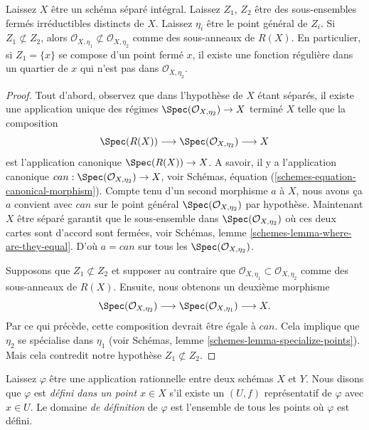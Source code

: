 \begin{lemma}

\label{lemma-distinct-local-rings}
Laissez $X$ être un schéma séparé intégral. Laissez $Z_1$, $Z_2$ être des sous-ensembles fermés irréductibles distincts de $X$. Laissez $\eta_i$ être le point général de $Z_i$. Si $Z_1 \not\subset Z_2$, alors $\mathcal{O}_{X, \eta_1} \not \subset \mathcal{O}_{X, \eta_2}$ comme des sous-anneaux de $R(X)$. En particulier, si $Z_1 = \{x\}$ se compose d'un point fermé $x$, il existe une fonction régulière dans un quartier de $x$ qui n'est pas dans $\mathcal{O}_{X, \eta_{2}}$.
\end{lemma}

\begin{proof}

Tout d'abord, observez que dans l'hypothèse de $X$ étant séparés, il existe une application unique des régimes
$\Spec(\mathcal{O}_{X, \eta_2}) \to X$ terminé $X$
telle que la composition
$$
\Spec(R(X)) \longrightarrow
\Spec(\mathcal{O}_{X, \eta_2}) \longrightarrow X
$$
est l'application canonique $\Spec(R(X)) \to X$. A savoir, il y a l'application canonique
$can : \Spec(\mathcal{O}_{X, \eta_2}) \to X$, voir Schémas, équation (\ref{schemes-equation-canonical-morphism}). Compte tenu d'un second morphisme $a$ à $X$, nous avons ça $a$ convient avec $can$
sur le point général
$\Spec(\mathcal{O}_{X, \eta_2})$ par hypothèse. Maintenant $X$ être séparé garantit que le sous-ensemble dans
$\Spec(\mathcal{O}_{X, \eta_2})$ où ces deux cartes sont d'accord sont fermées, voir Schémas, lemme \ref{schemes-lemma-where-are-they-equal}. D'où $a = can$ sur tous les $\Spec(\mathcal{O}_{X, \eta_2})$.

\medskip\noindent
Supposons que $Z_1 \not \subset Z_2$ et supposer au contraire que $\mathcal{O}_{X, \eta_{1}} \subset \mathcal{O}_{X, \eta_{2}}$ comme des sous-anneaux de $R(X)$. Ensuite, nous obtenons un deuxième morphisme $$
\Spec(\mathcal{O}_{X, \eta_{2}}) \longrightarrow
\Spec(\mathcal{O}_{X, \eta_{1}}) \longrightarrow
X.
$$ Par ce qui précède, cette composition devrait être égale à $can$. Cela implique que $\eta_2$ se spécialise dans $\eta_1$ (voir Schémas, lemme \ref{schemes-lemma-specialize-points}). Mais cela contredit notre hypothèse $Z_1 \not \subset Z_2$.
\end{proof}

\begin{definition}

\label{definition-domain-of-definition}
Laissez $\varphi$ être une application rationnelle entre deux schémas $X$ et $Y$. Nous disons que $\varphi$ est {\it défini dans un point $x \in X$} s'il existe un $(U, f)$ représentatif de $\varphi$ avec $x \in U$. Le domaine {\it de définition} de $\varphi$ est l'ensemble de tous les points où $\varphi$ est défini.
\end{definition}

